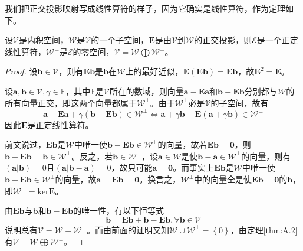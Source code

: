 \documentclass[main.tex]{subfiles}
\begin{document}
我们把正交投影映射写成线性算符的样子，因为它确实是线性算符，作为定理如下。
\begin{theorem}\label{thm:A.4}
    设$\mathcal{V}$是内积空间，$\mathcal{W}$是$\mathcal{V}$的一个子空间，$\mathbf{E}$是由$\mathcal{V}$到$\mathcal{W}$的正交投影，则$\mathcal{E}$是一个正定线性算符，$\mathcal{W}^\perp$是$\mathcal{E}$的零空间，$\mathcal{V}=\mathcal{W}\bigoplus\mathcal{W}^\perp$。
\end{theorem}
\begin{proof}
    设$\mathbf{b}\in\mathcal{V}$，则有$\mathbf{Eb}$是$\mathbf{b}$在$\mathcal{W}$上的最好近似，$\mathbf{E}\left(\mathbf{Eb}\right)=\mathbf{Eb}$，故$\mathbf{E}^2=\mathbf{E}$。

    设$\mathbf{a},\mathbf{b}\in\mathcal{V},\gamma\in\mathbb{F}$，其中$\mathbb{F}$是$\mathcal{V}$所在的数域，则向量$\mathbf{a}-\mathbf{Ea}$和$\mathbf{b}-\mathbf{Eb}$分别都与$\mathcal{W}$的所有向量正交，即这两个向量都属于$\mathcal{W}^\perp$。由于$\mathcal{W}^\perp$必是$\mathcal{V}$的子空间，故有
    \[
        \mathbf{a}-\mathbf{Ea}+\gamma\left(\mathbf{b}-\mathbf{Eb}\right)\in\mathcal{W}^\perp\Leftrightarrow\mathbf{a}+\gamma\mathbf{b}-\mathbf{E}\left(\mathbf{a}+\gamma\mathbf{b}\right)\in\mathcal{W}^\perp
    \]
    因此$\mathbf{E}$是正定线性算符。

    前文说过，$\mathbf{Eb}$是$\mathcal{W}$中唯一使$\mathbf{b}-\mathbf{Eb}\in\mathcal{W}^\perp$的向量，故若$\mathbf{Eb}=\mathbf{0}$，则$\mathbf{b}-\mathbf{Eb}=\mathbf{b}\in\mathcal{W}^\perp$。反之，若$\mathbf{b}\in\mathcal{W}^\perp$，设$\mathbf{a}\in\mathcal{W}$是使$\mathbf{b}-\mathbf{a}\in\mathcal{W}^\perp$的向量，则有$\left(\mathbf{a}|\mathbf{b}\right)=0$且$\left(\mathbf{a}|\mathbf{b}-\mathbf{a}\right)=0$，故只可能$\mathbf{a}=\mathbf{0}$。而事实上$\mathbf{Eb}$是$\mathcal{W}$中唯一使$\mathbf{b}-\mathbf{Eb}\in\mathcal{W}^\perp$的向量，故$\mathbf{a}=\mathbf{Eb}=\mathbf{0}$。换言之，$\mathcal{W}^\perp$中的向量全是使$\mathbf{Eb}=\mathbf{0}$的$\mathbf{b}$，即$\mathcal{W}^\perp=\mathrm{ker}\mathbf{E}$。


    由$\mathbf{Eb}$与$\mathbf{b}$和$\mathbf{b}-\mathbf{Eb}$的唯一性，有以下恒等式
    \[\mathbf{b}=\mathbf{Eb}+\mathbf{b}-\mathbf{Eb}, \forall\mathbf{b}\in\mathcal{V}\]
    说明总有$\mathcal{V}=\mathcal{W}+\mathcal{W}^\perp$。而由前面的证明又知$\mathcal{W}\cup\mathcal{W}^\perp=\left\{0\right\}$，由定理\ref{thm:A.2}有$\mathcal{V}=\mathcal{W}\bigoplus\mathcal{W}^\perp$。
\end{proof}
\end{document}
